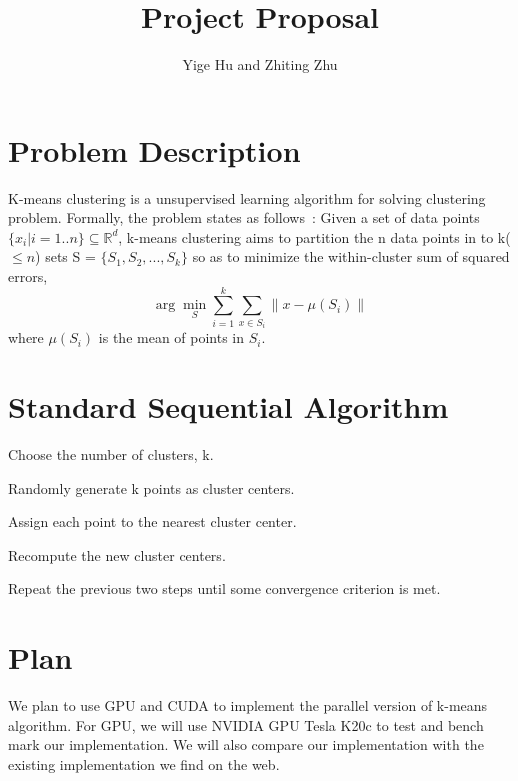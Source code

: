 \documentclass{article}
\begin{document}
\title{Project Proposal}
\author{Yige Hu and Zhiting Zhu}
\date{}
\maketitle

\section{Problem Description}
K-means clustering is a unsupervised learning algorithm for solving clustering
problem. Formally, the problem states
as follows~\cite{wiki}: Given a set of data points $\{x_i|i = 1..n\} \subseteq \mathbb{R}^d $, k-means clustering aims to partition the n data points
in to k($\leq n$) sets S = $\{S_1, S_2, ..., S_k\}$ so as to minimize
the within-cluster sum of squared
errors, $$\arg\min_{S}\sum_{i=1}^{k}\sum_{x \in S_i} \parallel x -
\mu(S_i)\parallel$$ where $\mu(S_i)$ is the mean of points in $S_i$. 

\section{Standard Sequential Algorithm}
\begin{compactitem}
\item{Choose the number of clusters, k.}
\item{Randomly generate k points as cluster centers.}
\item{Assign each point to the nearest cluster center.}
\item{Recompute the new cluster centers.}
\item{Repeat the previous two steps until some convergence criterion
  is met.}
\end{compactitem}

\section{Plan}
We plan to use GPU and CUDA to implement the parallel version of
k-means algorithm. For GPU, we will use NVIDIA GPU Tesla K20c to test
and bench mark our implementation. We will also compare our
implementation with the existing implementation we find on the
web\cite{serban-kmeans, gpuminer}.


  
\end{document}
